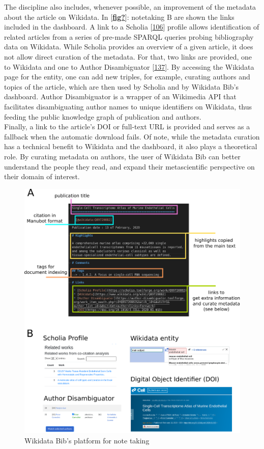 The discipline also includes, whenever possible, an improvement of the metadata about the article on Wikidata.
In {[}\protect\hyperlink{ref-fig}{\textbf{fig?}}{]}: notetaking B are shown the links included in the dashboard.
A link to a Scholia {[}\protect\hyperlink{ref-hxzL9pmm}{106}{]} profile allows identification of related articles from a series of pre-made SPARQL queries probing bibliography data on Wikidata.
While Scholia provides an overview of a given article, it does not allow direct curation of the metadata.
For that, two links are provided, one to Wikidata and one to Author Disambiguator {[}\protect\hyperlink{ref-1A9RvszKC}{137}{]}.
By accessing the Wikidata page for the entity, one can add new triples, for example, curating authors and topics of the article, which are then used by Scholia and by Wikidata Bib's dashboard.
Author Disambiguator is a wrapper of an Wikimedia API that facilitates disambiguating author names to unique identifiers on Wikidata, thus feeding the public knowledge graph of publication and authors.\\
Finally, a link to the article's DOI or full-text URL is provided and serves as a fallback when the automatic download fails.
Of note, while the metadata curation has a technical benefit to Wikidata and the dashboard, it also plays a theoretical role.
By curating metadata on authors, the user of Wikidata Bib can better understand the people they read, and expand their metascientific perspective on their domain of interest.

\begin{figure}
\hypertarget{fig:notetaking}{%
\centering
\includegraphics{images/note_taking_station_annotated_with_links.png}
\caption{Wikidata Bib's platform for note taking}\label{fig:notetaking}
}
\end{figure}

